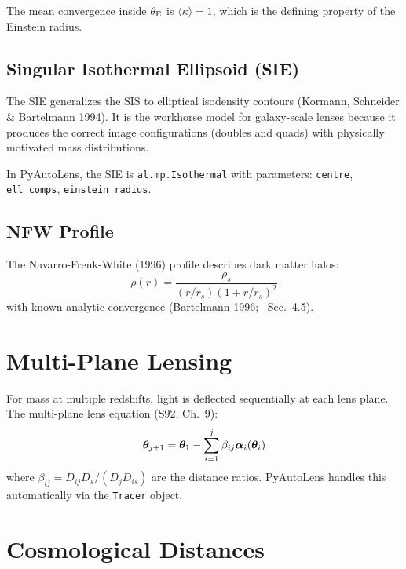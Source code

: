 \documentclass[11pt, letterpaper]{article}
\begin{document}
The mean convergence inside $\theta_{\rm E}$ is $\langle\kappa\rangle = 1$,
which is the defining property of the Einstein radius.

\subsection{Singular Isothermal Ellipsoid (SIE)}

The SIE generalizes the SIS to elliptical isodensity contours
(Kormann, Schneider \& Bartelmann 1994). It is the workhorse model for
galaxy-scale lenses because it produces the correct image configurations
(doubles and quads) with physically motivated mass distributions.

In PyAutoLens, the SIE is \texttt{al.mp.Isothermal} with parameters:
\texttt{centre}, \texttt{ell\_comps}, \texttt{einstein\_radius}.

\subsection{NFW Profile}

The Navarro-Frenk-White (1996) profile describes dark matter halos:
\begin{equation}
\rho(r) = \frac{\rho_s}{(r/r_s)(1 + r/r_s)^2}
\label{eq:nfw-density}
\end{equation}
with known analytic convergence (Bartelmann 1996; \CK\ Sec.~4.5).

\section{Multi-Plane Lensing}
\label{sec:multiplane}

For mass at multiple redshifts, light is deflected sequentially at each
lens plane. The multi-plane lens equation (S92, Ch.~9):
\begin{equation}
\bm{\theta}_{j+1} = \bm{\theta}_1 - \sum_{i=1}^{j} \beta_{ij} \bm{\alpha}_i(\bm{\theta}_i)
\label{eq:multiplane}
\end{equation}
where $\beta_{ij} = D_{ij} D_s / (D_j D_{is})$ are the distance ratios.
PyAutoLens handles this automatically via the \texttt{Tracer} object.

\section{Cosmological Distances}
\label{sec:distances}
\end{document}
